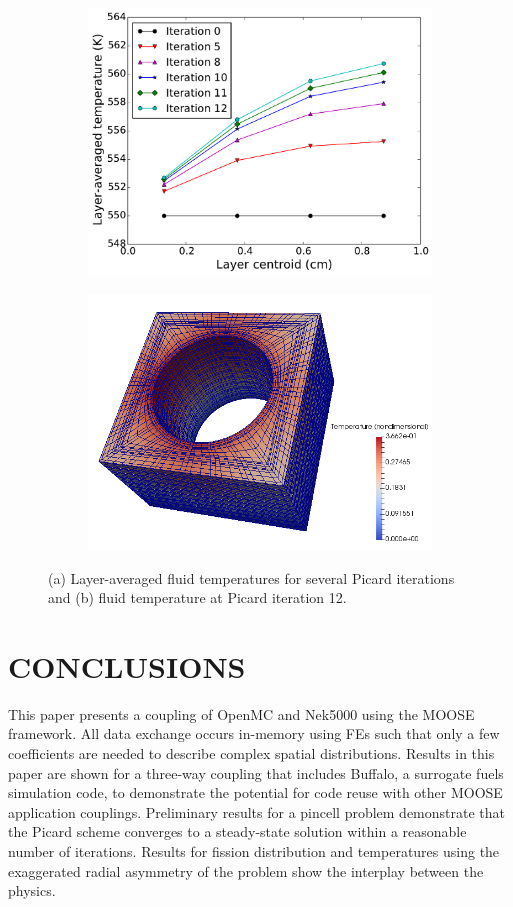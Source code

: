 \documentclass[letterpaper]{physor2018}
\begin{document}
\begin{figure}[!htb]
\centering
\begin{subfigure}{.5\textwidth}
  \centering
  \includegraphics[width=0.8\linewidth]{../Figures/layer_temps.pdf}
  \caption{}
\end{subfigure}%
\begin{subfigure}{.5\textwidth}
  \centering
  \includegraphics[width=0.8\linewidth]{../Figures/Nek_with_mesh.png}
  \caption{}
\end{subfigure}
\caption{(a) Layer-averaged fluid temperatures for several Picard iterations
and (b) fluid temperature at Picard iteration 12.}
\label{fig:layer_temps}
\end{figure}

\section{CONCLUSIONS}
\label{sec:Conclusions}
This paper presents a coupling of OpenMC and Nek5000
using the MOOSE framework. All data exchange occurs in-memory
using FEs such that only a few coefficients are needed to describe complex
spatial distributions. Results in this paper are shown for a three-way
coupling that includes Buffalo, a surrogate fuels simulation code, to demonstrate the potential for code reuse
with other MOOSE application couplings.
Preliminary results for a pincell problem demonstrate that the
Picard scheme converges to a steady-state solution within a reasonable
number of iterations. Results for fission distribution and temperatures
using the exaggerated radial asymmetry of the problem show the
interplay between the physics.
\end{document}

